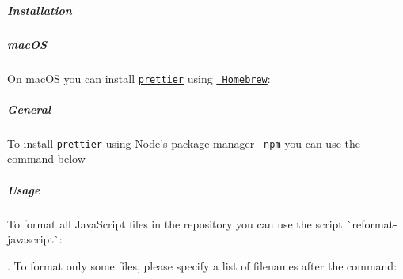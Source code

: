 \label{doc_CODING_md_autotoc_md999}%
%
\subparagraph*{Installation}

\subparagraph*{mac\+OS}

On mac\+OS you can install \href{https://prettier.io}{\texttt{ {\ttfamily prettier}}} using \href{https://brew.sh}{\texttt{ Homebrew}}\+:


\begin{DoxyCode}{0}
\end{DoxyCode}


\subparagraph*{General}

To install \href{https://prettier.io}{\texttt{ {\ttfamily prettier}}} using Node’s package manager \href{https://www.npmjs.com}{\texttt{ npm}} you can use the command below


\begin{DoxyCode}{0}
\end{DoxyCode}


\label{doc_CODING_md_autotoc_md1000}%
%
\subparagraph*{Usage}

To format all Java\+Script files in the repository you can use the script \`{}reformat-\/javascript\`{}\+:


\begin{DoxyCode}{0}
\end{DoxyCode}


. To format only some files, please specify a list of filenames after the command\+:


\begin{DoxyCode}{0}
\end{DoxyCode}



